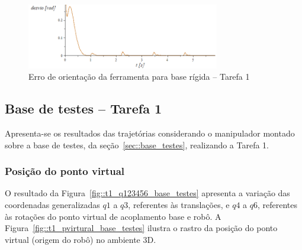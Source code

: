 \begin{figure}[h!]
	\centering 
 	\includegraphics[width=0.75\textwidth]{figs/t1_erroori_base_rig}
 	\caption{Erro de orientação da ferramenta para base rígida -- Tarefa
 	1}
 	\label{fig::t1_erroori_base_rig}
\end{figure}



\subsection{Base de testes -- Tarefa 1} \label{sec::res_testes}

Apresenta-se os resultados das trajetórias considerando o manipulador montado
sobre a base de testes, da seção~\ref{sec::base_testes}, realizando a Tarefa 1.

\subsubsection{Posição do ponto virtual}

O resultado da Figura~\ref{fig::t1_q123456_base_testes} apresenta a variação das
coordenadas generalizadas $q1$ a $q3$, referentes às translações, e $q4$ a $q6$,
referentes às rotações do ponto virtual de acoplamento base e robô. A
Figura~\ref{fig::t1_pvirtural_base_testes} ilustra o rastro da posição do ponto
virtual (origem do robô) no ambiente 3D.


